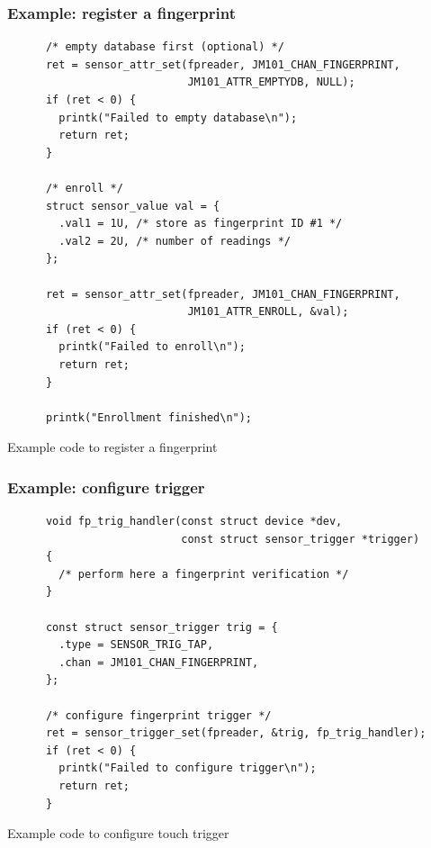 \documentclass[handout]{beamer}
\begin{document}
\begin{frame}[fragile]
  \frametitle{Example: register a fingerprint}

  \begin{listing}[H]
    \begin{verbatim}
      /* empty database first (optional) */
      ret = sensor_attr_set(fpreader, JM101_CHAN_FINGERPRINT,
                            JM101_ATTR_EMPTYDB, NULL);
      if (ret < 0) {
        printk("Failed to empty database\n");
        return ret;
      }

      /* enroll */
      struct sensor_value val = {
        .val1 = 1U, /* store as fingerprint ID #1 */
        .val2 = 2U, /* number of readings */
      };

      ret = sensor_attr_set(fpreader, JM101_CHAN_FINGERPRINT,
                            JM101_ATTR_ENROLL, &val);
      if (ret < 0) {
        printk("Failed to enroll\n");
        return ret;
      }

      printk("Enrollment finished\n");
    \end{verbatim}
    \caption{Example code to register a fingerprint}
  \end{listing}
\end{frame}

\begin{frame}[fragile]
  \frametitle{Example: configure trigger}

  \begin{listing}[H]
    \begin{verbatim}
      void fp_trig_handler(const struct device *dev,
                           const struct sensor_trigger *trigger)
      {
        /* perform here a fingerprint verification */
      }
      
      const struct sensor_trigger trig = {
        .type = SENSOR_TRIG_TAP,
        .chan = JM101_CHAN_FINGERPRINT,
      };
      
      /* configure fingerprint trigger */
      ret = sensor_trigger_set(fpreader, &trig, fp_trig_handler);
      if (ret < 0) {
        printk("Failed to configure trigger\n");
        return ret;
      }
    \end{verbatim}
    \caption{Example code to configure touch trigger}
  \end{listing}
\end{frame}

\end{document}
